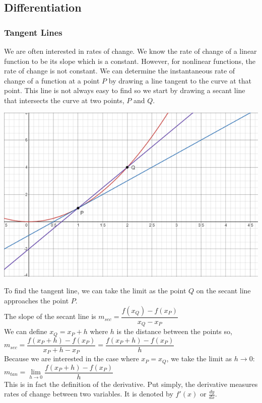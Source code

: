 \subsection{Differentiation}

\subsubsection{Tangent Lines}
We are often interested in rates of change. We know the rate of change of a linear function to be its slope which is a constant. However, for nonlinear functions, the rate of change is not constant. We can determine the instantaneous rate of change of a function at a point $P$ by drawing a line tangent to the curve at that point. This line is not always easy to find so we start by drawing a secant line that intersects the curve at two points, $P$ and $Q$.\\
\centerline{\includegraphics[scale =0.7]{DifferentialCalculusPictures/Tangent.png}}
To find the tangent line, we can take the limit as the point $Q$ on the secant line approaches the point $P$.\\
The slope of the secant line is $m_{sec}=\dfrac{f(x_Q)-f(x_P)}{x_Q-x_P}$\\
We can define $x_Q=x_P+h$ where $h$ is the distance between the points so,\\ ${m_{sec}=\dfrac{f(x_P+h)-f(x_P)}{x_P+h-x_P}=\dfrac{f(x_P+h)-f(x_P)}{h}}$\\
Because we are interested in the case where $x_P=x_Q$, we take the limit as $h\to 0$:\\
$m_{tan}=\displaystyle{\lim \limits_{h\to 0}\dfrac{f(x_P+h)-f(x_P)}{h}}$\\
This is in fact the definition of the derivative. Put simply, the derivative measures rates of change between two variables. It is denoted by $f'(x)$ or $\frac{dy}{dx}$.\\
